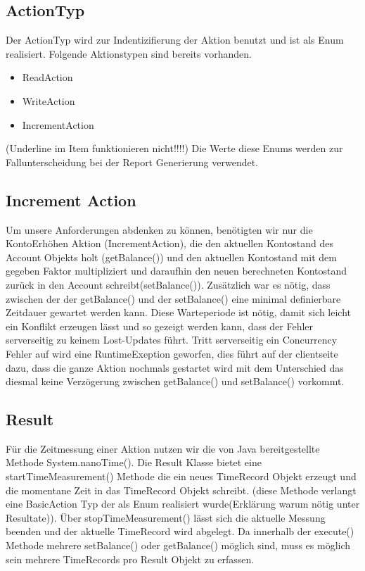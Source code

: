 \subsection{ActionTyp}
\label{sec:actionTyp}
Der ActionTyp wird zur Indentizifierung der Aktion benutzt und ist als Enum realisiert. Folgende Aktionstypen sind bereits vorhanden.

\begin{itemize}
\item ReadAction
\item WriteAction
\item IncrementAction
\end{itemize}
(Underline im Item funktionieren nicht!!!!)
Die Werte diese Enums werden zur Fallunterscheidung bei der Report Generierung verwendet.

 
\subsection{Increment Action}
\label{sec:incrementAction}
Um unsere Anforderungen abdenken zu können, benötigten wir nur die KontoErhöhen Aktion (IncrementAction), die den aktuellen Kontostand des Account Objekts holt (getBalance()) und den aktuellen Kontostand mit dem gegeben Faktor multipliziert und daraufhin den neuen berechneten Kontostand zurück in den Account schreibt(setBalance()). Zusätzlich war es nötig, dass zwischen der der getBalance() und der setBalance() eine minimal definierbare Zeitdauer gewartet werden kann. Diese Warteperiode ist nötig, damit sich leicht ein Konflikt erzeugen lässt und so gezeigt werden kann, dass der Fehler serverseitig zu keinem Lost-Updates führt. Tritt serverseitig ein Concurrency Fehler auf wird eine RuntimeExeption geworfen, dies führt auf der clientseite dazu, dass die ganze Aktion nochmals gestartet wird mit dem Unterschied das diesmal keine Verzögerung zwischen getBalance() und setBalance() vorkommt.

\subsection{Result}
\label{sec:result}
Für die Zeitmessung einer Aktion nutzen wir die von Java bereitgestellte Methode System.nanoTime(). Die Result Klasse bietet eine startTimeMeasurement() Methode die ein neues TimeRecord Objekt erzeugt und die momentane Zeit in das TimeRecord Objekt schreibt. (diese Methode verlangt eine BasicAction Typ der als Enum realisiert wurde(Erklärung warum nötig unter Resultate)). Über stopTimeMeasurement() lässt sich die aktuelle Messung beenden und der aktuelle TimeRecord wird abgelegt. Da innerhalb der execute() Methode mehrere setBalance() oder getBalance() möglich sind, muss es möglich sein mehrere TimeRecords pro Result Objekt zu erfassen.

